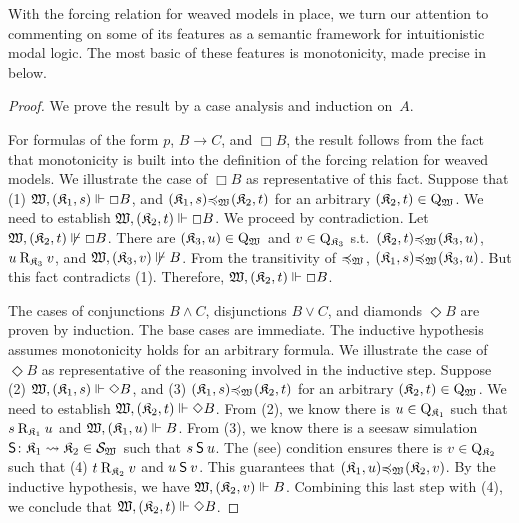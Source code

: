 With the forcing relation for weaved models in place, we turn our attention to commenting on some of its features as a semantic framework for intuitionistic modal logic.
The most basic of these features is monotonicity, made precise in  below.

\begin{proof}
    We prove the result by a case analysis and induction on~$A$.

    \medskip
    \noindent
    For formulas of the form $p$, $B \to C$, and $\Box B$, the result follows from the fact that monotonicity is built into the definition of the forcing relation for weaved models.
    We illustrate the case of $\Box B$ as representative of this fact.
    Suppose that (1) $\wforces {\pair {\kmodel_1} s} \Box B$, and ${\pair {\kmodel_1} s} \Fwm {\pair {\kmodel_2} t}$ for an arbitrary ${{\pair {\kmodel_2} t} \in \Qwm}$.
    We need to establish $\wforces {\pair {\kmodel_2} t} \Box B$.
    We proceed by contradiction.
    Let ${\nwforces {\pair {\kmodel_2} t} \Box B}$.
    There are ${\pair {\kmodel_3} u} \in \Qwm$ and $v \in \Wkm[3]$ s.t.\ ${\pair {\kmodel_2} t} \Fwm {\pair {\kmodel_3} u}$, $u \Rkm[3] v$, and $\nwforces {\pair {\kmodel_3} v} B$.
    From the transitivity of $\Fwm$, ${\pair {\kmodel_1} s} \Fwm {\pair {\kmodel_3} u}$.
    But this fact contradicts (1).
    Therefore, $\wforces {\pair {\kmodel_2} t} \Box B$.

    \medskip
    \noindent
    The cases of conjunctions $B \land C$, disjunctions $B \lor C$, and diamonds $\Diamond B$ are proven by induction.
    The base cases are immediate.
    The inductive hypothesis assumes monotonicity holds for an arbitrary formula.
    We illustrate the case of $\Diamond B$ as representative of the reasoning involved in the inductive step.
    Suppose (2) ${\wforces {\pair {\kmodel_1} s} \Diamond B}$, and (3) ${\pair {\kmodel_1} s} \Fwm {\pair {\kmodel_2} t}$ for an arbitrary ${\pair {\kmodel_2} t} \in \Qwm$.
    We need to establish $\wforces {\pair {\kmodel_2} t} \Diamond B$.
    From (2), we know there is $u \in \Qkm[1]$ such that $s \Rkm[1] u$ and $\wforces {\pair {\kmodel_1} u} B$.
    From (3), we know there is a seesaw simulation $\Sim \colon {\kmodel_1 \fsim \kmodel_2} \in \Swm$ such that $s \Sim u$.
    The (see) condition ensures there is $v \in \Wkm[2]$ such that (4) $t \Rkm[2] v$ and $u \Sim v$. This guarantees that ${\pair{\kmodel_1}{u}} \Fwm {\pair{\kmodel_2}{v}}$. By the inductive hypothesis, we have $\wforces{\pair{\kmodel_2}{v}} B$. Combining this last step with (4), we conclude that $\wforces{\pair{\kmodel_2}{t}} \Diamond B$.
\end{proof}

